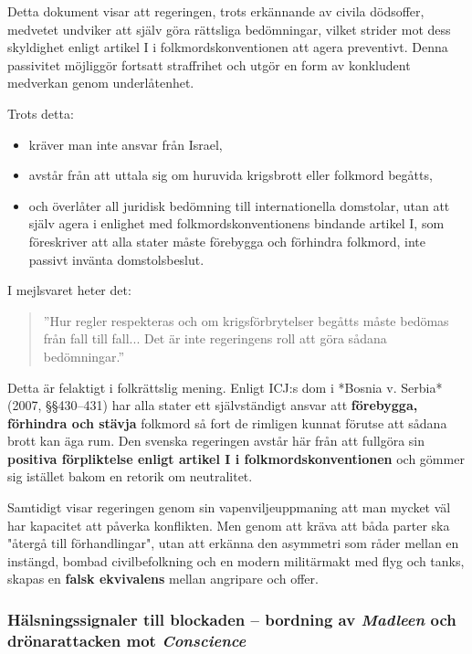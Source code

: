 Detta dokument visar att regeringen, trots erkännande av civila dödsoffer, medvetet undviker att själv göra 
rättsliga bedömningar, vilket strider mot dess skyldighet enligt artikel I i folkmordskonventionen att 
agera preventivt. Denna passivitet möjliggör fortsatt straffrihet och utgör en form av konkludent 
medverkan genom underlåtenhet.

Trots detta:
\begin{itemize}
\item kräver man inte ansvar från Israel,
\item avstår från att uttala sig om huruvida krigsbrott eller folkmord begåtts,
\item och överlåter all juridisk bedömning till internationella domstolar, utan att själv agera i enlighet med folkmordskonventionens bindande artikel I, som föreskriver att alla stater måste förebygga och förhindra folkmord, inte passivt invänta domstolsbeslut.
\end{itemize}

I mejlsvaret heter det:

\begin{quote}
”Hur regler respekteras och om krigsförbrytelser begåtts måste bedömas från fall till fall... Det är inte regeringens roll att göra sådana bedömningar.”
\end{quote}

Detta är felaktigt i folkrättslig mening. Enligt ICJ:s dom i *Bosnia v. Serbia* (2007, §§430–431) har alla stater ett 
självständigt ansvar att \textbf{förebygga, förhindra och stävja} folkmord så fort de rimligen kunnat förutse att sådana 
brott kan äga rum. Den svenska regeringen avstår här från att fullgöra sin \textbf{positiva förpliktelse enligt artikel I i 
folkmordskonventionen} och gömmer sig istället bakom en retorik om neutralitet.

Samtidigt visar regeringen genom sin vapenviljeuppmaning att man mycket väl har kapacitet att påverka konflikten. 
Men genom att kräva att båda parter ska "återgå till förhandlingar", utan att erkänna den asymmetri som råder 
mellan en instängd, bombad civilbefolkning och en modern militärmakt med flyg och tanks, skapas en \textbf{falsk ekvivalens} 
mellan angripare och offer.




\subsubsection{Hälsningssignaler till blockaden – bordning av \textit{Madleen} och drönarattacken mot \textit{Conscience}}

